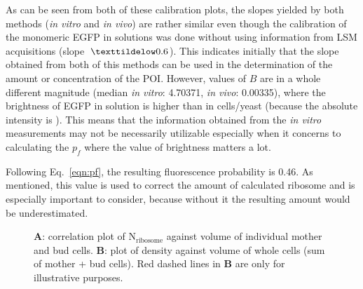 As can be seen from both of these calibration plots, the slopes yielded by both methods (\textit{in vitro} and \textit{in vivo}) are rather similar even though the calibration of the monomeric EGFP in solutions was done without using information from LSM acquisitions (slope~$\texttildelow 0.6$). 
This indicates initially that the slope obtained from both of this methods can be used in the determination of the amount or concentration of the POI. However, values of $B$ are in a whole different magnitude (median \textit{in vitro}: 4.70371, \textit{in vivo}: 0.00335), where the brightness of EGFP in solution is higher than in cells/yeast (because the absolute intensity is ). 
This means that the information obtained from the \textit{in vitro} measurements may not be necessarily utilizable especially when it concerns to calculating the $p_{f}$ where the value of brightness matters a lot.

Following Eq.~\ref{eqn:pf}, the resulting fluorescence probability is 0.46. As mentioned, this value is used to correct the amount of calculated ribosome and is especially important to consider, because without it the resulting amount would be underestimated.

\begin{figure}[!h]
\centering
{}\hfill
{}
\caption{\textbf{A}: correlation plot of N$_{\text{ribosome}}$ against volume of individual mother and bud cells. 
\textbf{B}: plot of density against volume of whole cells (sum of mother + bud cells). 
Red dashed lines in \textbf{B} are only for illustrative purposes. }
\label{fig:corplot}
\end{figure}

